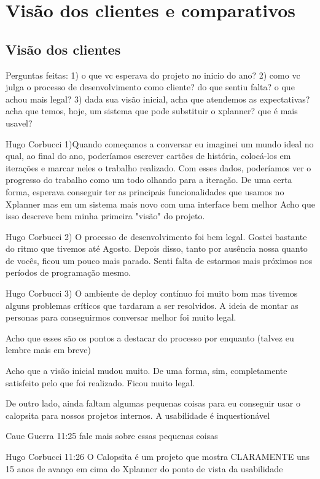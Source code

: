 \section{Visão dos clientes e comparativos}

\subsection{Visão dos clientes}
Perguntas feitas:
1) o que vc esperava do projeto no inicio do ano?
2) como vc julga o processo de desenvolvimento como cliente? do que sentiu falta? o que achou mais legal?
3) dada sua visão inicial, acha que atendemos as expectativas? acha que temos, hoje, um sistema que pode substituir o xplanner? que é mais usavel?

Hugo Corbucci
1)Quando começamos a conversar eu imaginei um mundo ideal no qual, ao final do ano, poderíamos escrever cartões de história, colocá-los em iterações e marcar neles o trabalho realizado. Com esses dados, poderíamos ver o progresso do trabalho como um todo olhando para a iteração.
De uma certa forma, esperava conseguir ter as principais funcionalidades que usamos no Xplanner mas em um sistema mais novo com uma interface bem melhor
Acho que isso descreve bem minha primeira "visão" do projeto.

Hugo Corbucci
2) O processo de desenvolvimento foi bem legal. Gostei bastante do ritmo que tivemos até Agosto. Depois disso, tanto por ausência nossa quanto de vocês, ficou um pouco mais parado.
Senti falta de estarmos mais próximos nos períodos de programação mesmo.

Hugo Corbucci
3) O ambiente de deploy contínuo foi muito bom mas tivemos alguns problemas críticos que tardaram a ser resolvidos. A ideia de montar as personas para conseguirmos conversar melhor foi muito legal.

Acho que esses são os pontos a destacar do processo por enquanto (talvez eu lembre mais em breve)

Acho que a visão inicial mudou muito. De uma forma, sim, completamente satisfeito pelo que foi realizado. Ficou muito legal.

De outro lado, ainda faltam algumas pequenas coisas para eu conseguir usar o calopsita para nossos projetos internos.
A usabilidade é inquestionável

Caue Guerra
11:25
fale mais sobre essas pequenas coisas

Hugo Corbucci
11:26
O Calopsita é um projeto que mostra CLARAMENTE uns 15 anos de avanço em cima do Xplanner do ponto de vista da usabilidade

